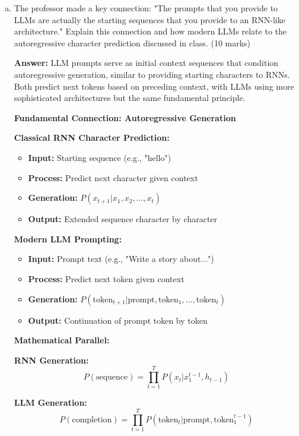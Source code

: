 \documentclass[12pt]{article}
\newcommand{\answer}[1]{{\color{answercolor}\textbf{Answer:} #1}}
\newcommand{\explanation}[1]{{\color{explanationcolor}#1}}
\begin{document}
\begin{enumerate}[(a)]
    \item The professor made a key connection: "The prompts that you provide to LLMs are actually the starting sequences that you provide to an RNN-like architecture." Explain this connection and how modern LLMs relate to the autoregressive character prediction discussed in class. \hfill (10 marks)
    
    \answer{LLM prompts serve as initial context sequences that condition autoregressive generation, similar to providing starting characters to RNNs. Both predict next tokens based on preceding context, with LLMs using more sophisticated architectures but the same fundamental principle.}
    
    \explanation{
    \textbf{Fundamental Connection: Autoregressive Generation}
    
    \textbf{Classical RNN Character Prediction:}
    \begin{itemize}
        \item \textbf{Input:} Starting sequence (e.g., "hello")
        \item \textbf{Process:} Predict next character given context
        \item \textbf{Generation:} $P(x_{t+1} | x_1, x_2, \ldots, x_t)$
        \item \textbf{Output:} Extended sequence character by character
    \end{itemize}
    
    \textbf{Modern LLM Prompting:}
    \begin{itemize}
        \item \textbf{Input:} Prompt text (e.g., "Write a story about...")
        \item \textbf{Process:} Predict next token given context
        \item \textbf{Generation:} $P(\text{token}_{t+1} | \text{prompt}, \text{token}_1, \ldots, \text{token}_t)$
        \item \textbf{Output:} Continuation of prompt token by token
    \end{itemize}
    
    \textbf{Mathematical Parallel:}
    
    \textbf{RNN Generation:}
    $$P(\text{sequence}) = \prod_{t=1}^T P(x_t | x_1^{t-1}, h_{t-1})$$
    
    \textbf{LLM Generation:}
    $$P(\text{completion}) = \prod_{t=1}^T P(\text{token}_t | \text{prompt}, \text{token}_1^{t-1})$$
    
}
\end{enumerate}
\end{document}
